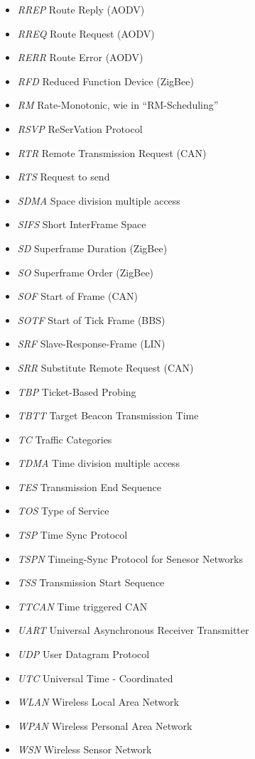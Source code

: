 \documentclass{article}
\begin{document}
\begin{itemize}
	\item \emph{RREP} Route Reply (AODV)
	\item \emph{RREQ} Route Request (AODV)
	\item \emph{RERR} Route Error (AODV)
	\item \emph{RFD} Reduced Function Device (ZigBee)
	\item \emph{RM} Rate-Monotonic, wie in "`RM-Scheduling"'
	\item \emph{RSVP} ReSerVation Protocol
	\item \emph{RTR} Remote Transmission Request (CAN)
	\item \emph{RTS} Request to send
	\item \emph{SDMA} Space division multiple access
	\item \emph{SIFS} Short InterFrame Space
	\item \emph{SD} Superframe Duration (ZigBee)
	\item \emph{SO} Superframe Order (ZigBee)
	\item \emph{SOF} Start of Frame (CAN)
	\item \emph{SOTF} Start of Tick Frame (BBS)
	\item \emph{SRF} Slave-Response-Frame (LIN)
	\item \emph{SRR} Substitute Remote Request (CAN)
	\item \emph{TBP} Ticket-Based Probing
	\item \emph{TBTT} Target Beacon Transmission Time
	\item \emph{TC} Traffic Categories
	\item \emph{TDMA} Time division multiple access
	\item \emph{TES} Transmission End Sequence
	\item \emph{TOS} Type of Service
	\item \emph{TSP} Time Sync Protocol
	\item \emph{TSPN} Timeing-Sync Protocol for Senesor Networks
	\item \emph{TSS} Transmission Start Sequence
	\item \emph{TTCAN} Time triggered CAN
	\item \emph{UART} Universal Asynchronous Receiver Transmitter
	\item \emph{UDP} User Datagram Protocol
	\item \emph{UTC} Universal Time - Coordinated
	\item \emph{WLAN} Wireless Local Area Network
	\item \emph{WPAN} Wireless Personal Area Network
	\item \emph{WSN} Wireless Sensor Network
\end{itemize}
\end{document}

